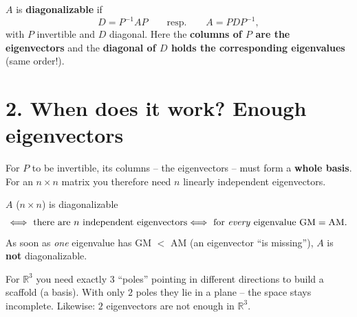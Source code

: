 \documentclass[a4paper,12pt]{article}
\newcommand{\EV}{eigenvector}
\begin{document}
\begin{merkbox}[title={The formula}]
$A$ is \textbf{diagonalizable} if
\[
D = P^{-1} A P \qquad\text{resp.}\qquad A = P D P^{-1},
\]
with $P$ invertible and $D$ diagonal. Here the \textbf{columns of $P$ are the eigenvectors} and the \textbf{diagonal of $D$ holds the corresponding eigenvalues} (same order!).
\end{merkbox}

\section*{2. When does it work? Enough eigenvectors}

For $P$ to be invertible, its columns -- the eigenvectors -- must form a \textbf{whole basis}. For an $n\times n$ matrix you therefore need $n$ linearly independent eigenvectors.

\begin{merkbox}[title={Diagonalizability criterion}]
$A$ ($n\times n$) is diagonalizable
\[
\Longleftrightarrow \ \text{there are } n \text{ independent eigenvectors}
\Longleftrightarrow \ \text{for \emph{every} eigenvalue } \text{GM} = \text{AM}.
\]
As soon as \emph{one} eigenvalue has GM $<$ AM (an \EV{} ``is missing''), $A$ is \textbf{not} diagonalizable.
\end{merkbox}

\begin{analogie}
For $\mathbb{R}^3$ you need exactly $3$ ``poles'' pointing in different directions to build a scaffold (a basis). With only $2$ poles they lie in a plane -- the space stays incomplete. Likewise: $2$ eigenvectors are not enough in $\mathbb{R}^3$.
\end{analogie}

\begin{center}
\end{center}
\end{document}
